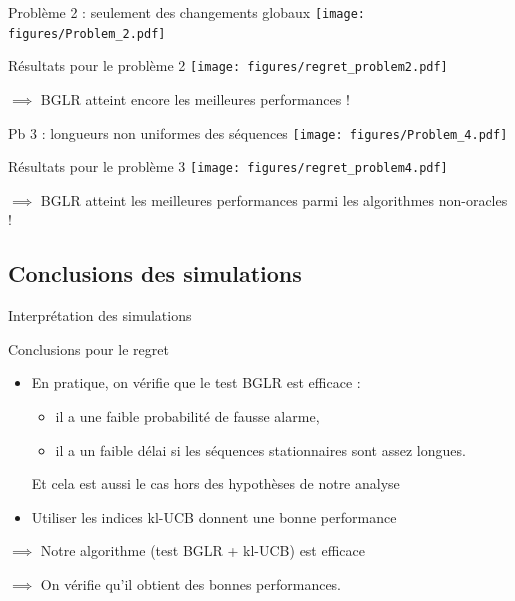 \documentclass[11pt,french,ignorenonframetext,]{beamer}
\providecommand{\tightlist}{%
  \setlength{\itemsep}{0pt}\setlength{\parskip}{0pt}}
\begin{document}
\begin{frame}[plain]{Problème 2 : seulement des changements globaux}
  \centering
  \texttt{[image: figures/Problem\_2.pdf]}
\end{frame}

\begin{frame}[plain]{Résultats pour le problème 2}
  \centering
  \texttt{[image: figures/regret\_problem2.pdf]}

  $\implies$ BGLR atteint encore les meilleures performances \dCooley{} !
\end{frame}


\begin{frame}[plain]{Pb 3 : longueurs non uniformes des séquences}
  \centering
  \texttt{[image: figures/Problem\_4.pdf]}
\end{frame}

\begin{frame}[plain]{Résultats pour le problème 3}
  \centering
  \texttt{[image: figures/regret\_problem4.pdf]}

  $\implies$ BGLR atteint les meilleures performances parmi les algorithmes non-oracles \dCooley{} !
\end{frame}


\subsection{\hfill{}Conclusions des simulations\hfill{}}

\begin{frame}{Interprétation des simulations}

  \begin{block}{Conclusions pour le regret}
    \begin{itemize}
      \item
      En pratique, on vérifie que le \alert{test BGLR est efficace} \dCooley{} :
      \begin{itemize}\tightlist
        \item
        il a une \alert{faible probabilité de fausse alarme},
        \item
        il a un \alert{faible délai} si les séquences stationnaires sont assez longues.
      \end{itemize}
      Et cela est aussi le cas hors des hypothèses de notre analyse
      \item
      Utiliser les indices kl-UCB donnent une bonne performance \dCooley{}
    \end{itemize}
    $\implies$ Notre algorithme (test BGLR + kl-UCB) est efficace

    $\implies$ On vérifie qu'il obtient des bonnes performances.
  \end{block}

\end{frame}
\end{document}
